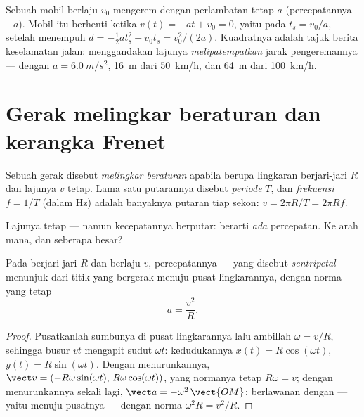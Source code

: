 \begin{example}\label{ex:g12:kinematics-2d:braking}
Sebuah mobil berlaju $v_0$ mengerem dengan perlambatan tetap $a$
(percepatannya $-a$). Mobil itu berhenti ketika
$v(t) = -a t + v_0 = 0$, yaitu pada $t_s = v_0/a$, setelah menempuh
$d = -\tfrac12 a t_s^2 + v_0 t_s =
v_0^2/(2a)$. Kuadratnya adalah tajuk
berita keselamatan jalan: menggandakan lajunya
\emph{melipatempatkan} jarak pengeremannya --- dengan
$a =
\qty{6.0}{m/s^2}$, \qty{16}{m} dari \qty{50}{km/h}, dan \qty{64}{m}
dari \qty{100}{km/h}.
\end{example}

\section{Gerak melingkar beraturan dan kerangka Frenet}

\begin{definition}\label{def:g12:kinematics-2d:ucm}
Sebuah gerak disebut \emph{melingkar beraturan} apabila  berupa lingkaran berjari-jari $R$ dan
lajunya $v$ tetap. Lama satu putarannya disebut
\emph{periode} $T$, dan \emph{frekuensi}
$f = 1/T$ (dalam \unit{Hz}) adalah banyaknya putaran tiap sekon:
$v = 2\pi R/T = 2\pi R f$.
\end{definition}

Lajunya tetap --- namun kecepatannya berputar: berarti \emph{ada}
percepatan. Ke arah mana, dan seberapa besar?

\begin{theorem}\label{thm:g12:kinematics-2d:centripetal}
%
Pada  berjari-jari $R$ dan berlaju $v$,
percepatannya --- yang disebut \emph{sentripetal} --- menunjuk dari
titik yang bergerak menuju pusat lingkarannya, dengan norma yang tetap
\[
a = \frac{v^2}{R}.
\]
\end{theorem}

\begin{proof}
Pusatkanlah sumbunya di pusat lingkarannya lalu ambillah
$\omega = v/R$, sehingga busur $v t$ mengapit sudut $\omega t$:
kedudukannya $x(t) = R\cos(\omega t)$, $y(t) = R\sin(\omega t)$. Dengan
menurunkannya, $\vect v = (-R\omega\sin(\omega t),\, R\omega\cos(\omega t))$, yang normanya tetap $R\omega = v$; dengan
menurunkannya sekali lagi, $\vect a = -\omega^2\,\vect{OM}$: berlawanan
dengan  --- yaitu menuju pusatnya --- dengan norma
$\omega^2 R = v^2/R$.
\end{proof}

